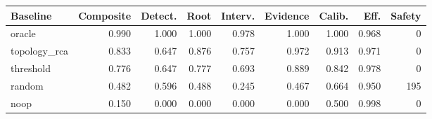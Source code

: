 \begin{tabular}{lrrrrrrrr}
\toprule
Baseline & Composite & Detect. & Root & Interv. & Evidence & Calib. & Eff. & Safety \\
\midrule
oracle & 0.990 & 1.000 & 1.000 & 0.978 & 1.000 & 1.000 & 0.968 & 0 \\
topology\_rca & 0.833 & 0.647 & 0.876 & 0.757 & 0.972 & 0.913 & 0.971 & 0 \\
threshold & 0.776 & 0.647 & 0.777 & 0.693 & 0.889 & 0.842 & 0.978 & 0 \\
random & 0.482 & 0.596 & 0.488 & 0.245 & 0.467 & 0.664 & 0.950 & 195 \\
noop & 0.150 & 0.000 & 0.000 & 0.000 & 0.000 & 0.500 & 0.998 & 0 \\
\bottomrule
\end{tabular}
